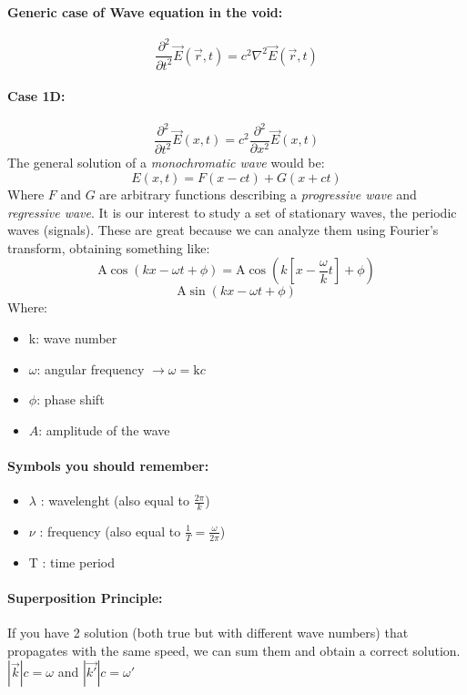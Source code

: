 \paragraph{Generic case of Wave equation in the void:} $$\frac{\partial^2}{\partial t^2} \vec{E} (\vec{r}, t) = c^2 \nabla ^ 2 \vec{E} (\vec{r}, t)$$

\paragraph{Case 1D:} $$\frac{\partial^2}{\partial t^2} \vec{E} (x, t) = c^2 \frac{\partial^2}{\partial x^2} \vec{E} (x, t)$$ The general solution of a \textit{monochromatic wave} would be: $$E(x, t) = F(x-ct)+G(x+ct)$$ Where $F$ and $G$ are arbitrary functions describing a \textit{progressive wave} and \textit{regressive wave}. It is our interest to study a set of stationary waves, the periodic waves (signals). These are great because we can analyze them using Fourier's transform, obtaining something like: $$\text{A} \cos(kx - \omega t + \phi) = \text{A} \cos\left(k \left[x - \frac{\omega}{k}t\right] + \phi\right)$$ $$\text{A} \sin(kx - \omega t + \phi)$$ Where: 
\begin{itemize}
	\item k: wave number
	\item $\omega$: angular frequency $\rightarrow \omega = \text{k} c$
	\item $\phi$: phase shift 
	\item $A$: amplitude of the wave
\end{itemize} 

\paragraph{Symbols you should remember:}
\begin{itemize}
	\item $\lambda$ : wavelenght (also equal to $\frac{2\pi}{k}$)
	\item $\nu$ : frequency (also equal to $\frac{1}{T} = \frac{\omega}{2\pi}$)
	\item T : time period
\end{itemize}

\paragraph{Superposition Principle:} If you have 2 solution (both true but with different wave numbers) that propagates with the same speed, we can sum them and obtain a correct solution. $|\vec{k}|c = \omega$ and $|\vec{k'}|c = \omega'$

